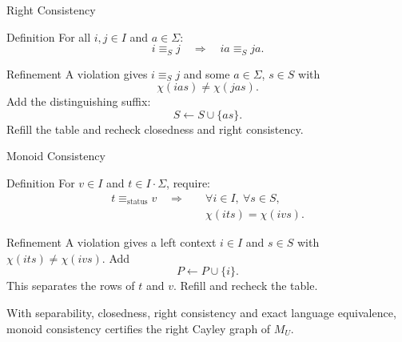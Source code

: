 \documentclass{beamer}
\begin{document}
\begin{frame}{Right Consistency}
    \begin{block}{Definition}
        For all $i,j\in I$ and $a\in\Sigma$:
        $$
        i\equiv_S j\quad\Longrightarrow\quad ia\equiv_S ja.
        $$
    \end{block}
    \begin{block}{Refinement}
        A violation gives $i\equiv_S j$ and some $a\in\Sigma$, $s\in S$ with
        $$
        \chi(ias)\neq\chi(jas).
        $$
        Add the distinguishing suffix:
        $$
        S\leftarrow S\cup\{as\}.
        $$
        Refill the table and recheck closedness and right consistency.
    \end{block}
\end{frame}

\begin{frame}{Monoid Consistency}
    \begin{block}{Definition}
        For $v\in I$ and $t\in I\cdot\Sigma$, require:
        $$
        \begin{aligned}
            t\equiv_{\mathrm{status}}v
            \quad\Longrightarrow\quad
            &\forall i\in I,\ \forall s\in S,\\
            &\chi(its)=\chi(ivs).
        \end{aligned}
        $$
    \end{block}
    \begin{block}{Refinement}
        A violation gives a left context $i\in I$ and $s\in S$ with
        $\chi(its)\neq\chi(ivs)$. Add
        $$
        P\leftarrow P\cup\{i\}.
        $$
        This separates the rows of $t$ and $v$. Refill and recheck the table.
    \end{block}
    {\small With separability, closedness, right consistency and exact language equivalence,
    monoid consistency certifies the right Cayley graph of $M_U$.}
\end{frame}
\end{document}
